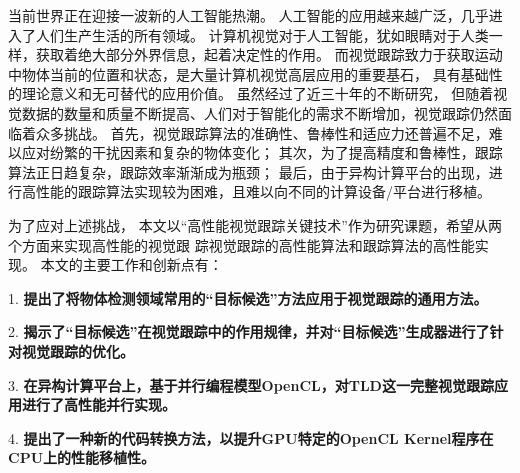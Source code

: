 \begin{cabstract}
当前世界正在迎接一波新的人工智能热潮。
人工智能的应用越来越广泛，几乎进入了人们生产生活的所有领域。
计算机视觉对于人工智能，犹如眼睛对于人类一样，获取着绝大部分外界信息，起着决定性的作用。
而视觉跟踪致力于获取运动中物体当前的位置和状态，是大量计算机视觉高层应用的重要基石，
具有基础性的理论意义和无可替代的应用价值。
虽然经过了近三十年的不断研究，
但随着视觉数据的数量和质量不断提高、人们对于智能化的需求不断增加，视觉跟踪仍然面临着众多挑战。
首先，视觉跟踪算法的准确性、鲁棒性和适应力还普遍不足，难以应对纷繁的干扰因素和复杂的物体变化；
其次，为了提高精度和鲁棒性，跟踪算法正日趋复杂，跟踪效率渐渐成为瓶颈；
最后，由于异构计算平台的出现，进行高性能的跟踪算法实现较为困难，且难以向不同的计算设备/平台进行移植。

为了应对上述挑战，
本文以``高性能视觉跟踪关键技术''作为研究课题，希望从两个方面来实现高性能的视觉跟
踪\pozhehao 视觉跟踪的高性能算法和跟踪算法的高性能实现。
本文的主要工作和创新点有：
\begin{compactitem}
\item[1.] \textbf{提出了将物体检测领域常用的``目标候选''方法应用于视觉跟踪的通用方法。}
\end{compactitem}

\begin{compactitem}
\item[2.] \textbf{揭示了``目标候选''在视觉跟踪中的作用规律，并对``目标候选''生成器进行了针对视觉跟踪的优化。}
\end{compactitem}

\begin{compactitem}
\item[3.] \textbf{在异构计算平台上，基于并行编程模型OpenCL，对TLD这一完整视觉跟踪应用进行了高性能并行实现。}
\end{compactitem}

\begin{compactitem}
\item[4.] \textbf{提出了一种新的代码转换方法，以提升GPU特定的OpenCL Kernel程序在CPU上的性能移植性。}
\end{compactitem}



\end{cabstract}

\begin{eabstract}


\end{eabstract}

